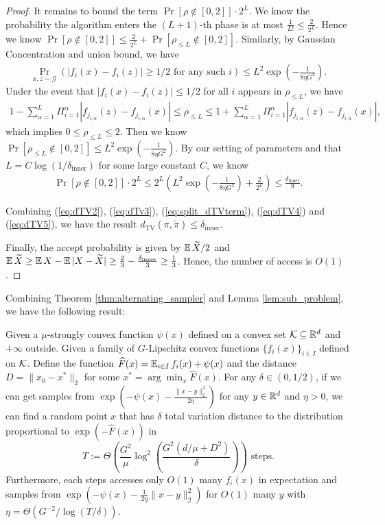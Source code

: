 \begin{proof}
It remains to bound the term $\Pr[\rho\notin[0,2]]\cdot 2^L$.
We know the probability the algorithm enters the $(L+1)$-th phase is at most $\frac{1}{L!}\leq \frac{2}{2^L}$.
Hence we know $\Pr[\rho \notin[0,2]]\leq \frac{2}{2^L}+\Pr[\rho_{\leq L}\notin[0,2]]$.
Similarly, by Gaussian Concentration and union bound, we have
\begin{align*}
    \Pr_{x,z\sim\mathcal{G}}(|f_{i}(x)-f_{i}(z)|\geq1/2\text{ for any such }i)\leq L^{2}\exp(-\frac{1}{8\eta G^{2}}).
\end{align*}
Under the event that $|f_i(x)-f_i(z)|\leq 1/2$ for all $i$ appears in $\rho_{\leq L}$, we have
\begin{align*}
    1-\sum_{\alpha=1}^{L}\Pi_{i=1}^{\alpha}|f_{j_{i,\alpha}}(z)-f_{j_{i,\alpha}}(x)|\leq \rho_{\le L}\le 1+\sum_{\alpha=1}^{L}\Pi_{i=1}^{\alpha}|f_{j_{i,\alpha}}(z)-f_{j_{i,\alpha}}(x)|,
\end{align*}
which implies $0\le \rho_{\leq L}\leq 2$.
Then we know $\Pr[\rho_{\le L}\notin[0,2]]\leq L^2\exp(-\frac{1}{8\eta G^2})$.
By our setting of parameters and that $L = C \log(1/\delta_{\mathrm{inner}})$ for some large constant $C$, we know
\begin{align}
\label{eq:dTV5}
    \Pr[\rho\notin[0,2]]\cdot 2^L\leq 2^L(L^2\exp(-\frac{1}{8\eta G^2})+\frac{2}{2^L})\leq \frac{\delta_{\mathrm{inner}}}{9}.
\end{align}

Combining (\ref{eq:dTV2}), (\ref{eq:dTv3}), (\ref{eq:split_dTVterm}), (\ref{eq:dTV4}) and (\ref{eq:dTV5}),
we have the result $d_{\mathrm{TV}}(\pi,\widetilde{\pi})\leq\delta_{\mathrm{inner}}$.

Finally, the accept probability is given by $\operatorname*{\mathbb{E}}\widetilde{X}/2$ and $\operatorname*{\mathbb{E}}\widetilde{X}\geq\operatorname*{\mathbb{E}} X-\operatorname*{\mathbb{E}}|X-\widetilde{X}|\geq\frac{2}{3}-\frac{\delta_{\mathrm{inner}}}{3}\geq\frac{1}{3}$.
Hence, the number of access is $O(1)$.
\end{proof}
Combining Theorem \ref{thm:alternating_sampler} and Lemma \ref{lem:sub_problem},
we have the following result:
\begin{theorem}
\label{thm:sampler}
Given a $\mu$-strongly convex function $\psi(x)$ defined on a convex set $\mathcal K \subseteq \mathbb{R}^{d}$ and $+\infty$ outside. Given a family of $G$-Lipschitz convex functions $\{f_{i}(x)\}_{i\in I}$ defined on $\mathcal K$.
Define the function $\widehat{F}(x)=\operatorname*{\mathbb{E}}_{i\in I}f_{i}(x)+\psi(x)$ and 
the distance $D=\|x_{0}-x^{*}\|_{2}$ for some $x^{*}=\arg\min_{x}\widehat{F}(x)$.
For any $\delta\in(0,1/2)$, if we can get samples from $\exp(-\psi(x)-\frac{\|x-y\|_2^2}{2\eta}) $ for any $y\in\mathbb{R}^d$ and $\eta>0$, we can find a random point $x$ that
has $\delta$ total variation distance to the distribution proportional to $\exp(-\widehat{F}(x))$ in
\[
T:=\Theta(\frac{G^{2}}{\mu}\log^{2}(\frac{G^{2}(d/\mu+D^{2})}{\delta}))\text{ steps}.
\]
Furthermore, each steps accesses only $O(1)$ many $f_{i}(x)$ in
expectation and samples from $\exp(-\psi(x) - \frac{1}{2\eta} \|x-y\|^2_2)$ for $O(1)$ many $y$ with $\eta = \Theta(G^{-2}/\log(T/\delta))$.
\end{theorem}

